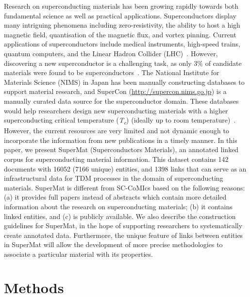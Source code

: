 \documentclass[fleqn,10pt]{wlscirep}
\begin{document}
Research on superconducting materials has been growing rapidly towards both fundamental science as well as practical applications. Superconductors display many intriguing phenomena including zero-resistivity, the ability to host a high magnetic field, quantisation of the magnetic flux, and vortex pinning.  
Current applications of superconductors include medical instruments, high-speed trains, quantum computers, and the Linear Hadron Collider (LHC)~\cite{PhilippeBook, Kizu2010ConstructionOT, Cardani2017NewAO}. 
However, discovering a new superconductor is a challenging task, as only 3\% of candidate materials were found to be superconductors~\cite{Konno2018DeepLO}.
The National Institute for Materials Science (NIMS) in Japan has been manually constructing databases to support material research, and SuperCon (\url{http://supercon.nims.go.jp}) is a manually curated data source for the superconductor domain.
These databases would help researchers design new superconducting materials with a higher superconducting critical temperature (\textit{T\textsubscript{c}}) (ideally up to room temperature)~\cite{Hamlin2019SuperconductivityNR,stanev2017machine}.
However, the current resources are very limited and not dynamic enough to incorporate the information from new publications in a timely manner. 
In this paper, we present SuperMat (Superconductors Materials), an annotated linked corpus for superconducting material information. 
This dataset contains 142 documents with 16052 (7166 unique) entities, and 1398 links that can serve as an infrastructural data for TDM processes in the domain of superconducting materials. 
SuperMat is different from SC-CoMIcs based on the following reasons: (a) it provides full papers instead of abstracts which contain more detailed information about the research on superconducting materials; (b) it contains linked entities, and (c) is publicly available. 
We also describe the construction guidelines for SuperMat, in the hope of supporting researchers to systematically create annotated data.
Furthermore, the unique feature of links between entities in SuperMat will allow the development of more precise methodologies to associate a particular material with its properties.

\label{sec:method}
\section*{Methods}

\label{content-acquisition}
\end{document}
